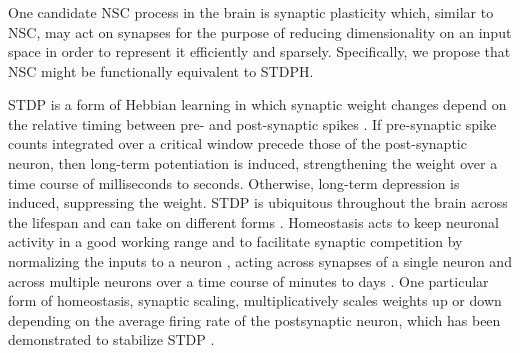 \subsubsection*{}


One candidate \ac{NSC} process in the brain is synaptic plasticity
which, similar to \ac{NSC},
may act on synapses for the purpose of reducing dimensionality on an input space in order to represent it efficiently and sparsely.
Specifically, we propose that \ac{NSC} might be functionally equivalent to \ac{STDPH}.

\Ac{STDP} is a form of Hebbian learning in which synaptic weight changes depend on the relative timing between pre- and post-synaptic spikes
\cite{BiPoo1998,SongAbbott2000}.
If pre-synaptic spike counts integrated over a critical window precede those of the post-synaptic neuron, then long-term potentiation is induced, strengthening the weight over a time course of milliseconds to seconds. Otherwise, long-term depression is induced, suppressing the weight. \Ac{STDP} is ubiquitous throughout the brain across the lifespan and can take on different forms \cite{Caporale2008STDP,Holtmaat2009STDP}.
%
Homeostasis acts to keep neuronal activity in a good working range \cite{Watt2010}
and to facilitate synaptic competition by normalizing the inputs to a neuron \cite{chistiakova2015},
acting across synapses of a single neuron and across multiple neurons
over a time course of minutes to days
\cite{turrigiano1998}.
One particular form of homeostasis, synaptic scaling, multiplicatively scales weights up or down
depending on the average firing rate of the postsynaptic neuron, which has
been demonstrated to stabilize \ac{STDP} \cite{Carlson2013,Buonomano2005,VanRossum2000}.

